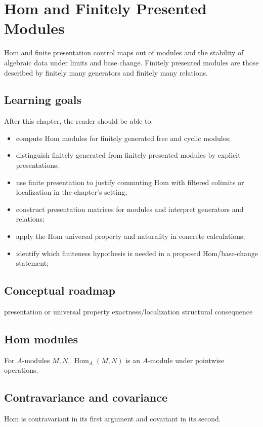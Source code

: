 \chapter{Hom and Finitely Presented Modules}
\label{ch:v12}

Hom and finite presentation control maps out of modules and the stability of algebraic data under limits and base change. Finitely presented modules are those described by finitely many generators and finitely many relations.

\section*{Learning goals}
After this chapter, the reader should be able to:
\begin{itemize}
\item compute Hom modules for finitely generated free and cyclic modules;
\item distinguish finitely generated from finitely presented modules by explicit presentations;
\item use finite presentation to justify commuting Hom with filtered colimits or localization in the chapter's setting;
\item construct presentation matrices for modules and interpret generators and relations;
\item apply the Hom universal property and naturality in concrete calculations;
\item identify which finiteness hypothesis is needed in a proposed Hom/base-change statement;
\end{itemize}
\section*{Conceptual roadmap}
\volroadmap
  {presentation or universal property}
  {exactness/localization}
  {structural consequence}

\section{Hom modules}
For $A$-modules $M,N$, $\operatorname{Hom}_A(M,N)$ is an $A$-module under pointwise operations.

\section{Contravariance and covariance}
Hom is contravariant in its first argument and covariant in its second.

